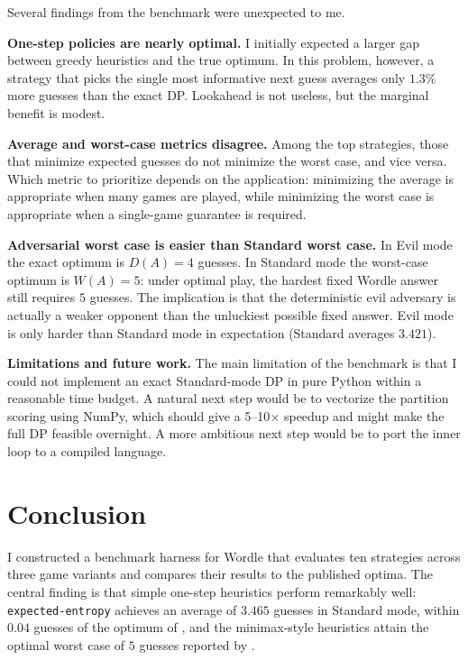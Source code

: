 \documentclass[11pt]{article}
\begin{document}
Several findings from the benchmark were unexpected to me.

\textbf{One-step policies are nearly optimal.} I initially expected a
larger gap between greedy heuristics and the true optimum. In this
problem, however, a strategy that picks the single most informative
next guess averages only $1.3\%$ more guesses than the exact DP.
Lookahead is not useless, but the marginal benefit is modest.

\textbf{Average and worst-case metrics disagree.} Among the top
strategies, those that minimize expected guesses do not minimize the
worst case, and vice versa. Which metric to prioritize depends on the
application: minimizing the average is appropriate when many games
are played, while minimizing the worst case is appropriate when a
single-game guarantee is required.

\textbf{Adversarial worst case is easier than Standard worst case.}
In Evil mode the exact optimum is $D(A) = 4$ guesses. In Standard
mode the worst-case optimum is $W(A) = 5$: under optimal play, the
hardest fixed Wordle answer still requires $5$ guesses. The implication
is that the deterministic evil adversary is actually a weaker opponent
than the unluckiest possible fixed answer. Evil mode is only harder
than Standard mode in expectation (Standard averages $3.421$).

\textbf{Limitations and future work.} The main limitation of the
benchmark is that I could not implement an exact Standard-mode DP in
pure Python within a reasonable time budget. A natural next step
would be to vectorize the partition scoring using NumPy, which should
give a 5--10$\times$ speedup and might make the full DP feasible
overnight. A more ambitious next step would be to port the inner loop
to a compiled language.

\section*{Conclusion}

I constructed a benchmark harness for Wordle that evaluates ten
strategies across three game variants and compares their results to
the published optima. The central finding is that simple one-step
heuristics perform remarkably well: \texttt{expected-entropy} achieves
an average of $3.465$ guesses in Standard mode, within $0.04$ guesses
of the optimum of \citet{bertsimas2022wordle}, and the minimax-style
heuristics attain the optimal worst case of $5$ guesses reported by
\citet{selby2022wordle}.
\end{document}

